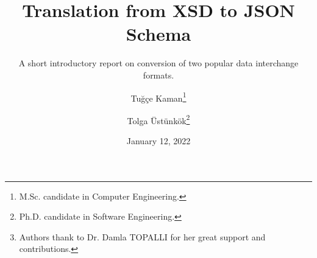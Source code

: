 \documentclass[paper=a4,oneside,fontsize=12,parskip=full,titlepage=firstiscover,toc=sectionentrywithdots]{scrartcl}
\begin{document}
    \titlehead{Atılım University\\Department of Computer Engineering}
    \title{Translation from XSD to JSON Schema}
    \subtitle{A short introductory report on conversion of two popular data interchange formats.}
    \author{Tuğçe Kaman\thanks{M.Sc. candidate in Computer Engineering.} \and Tolga Üstünkök\thanks{Ph.D. candidate in Software Engineering.}}
    \date{January 12, 2022}
    \publishers{CMPE541 - Advanced Databases\thanks{Authors thank to Dr. Damla TOPALLI for her great support and contributions.}}
    \maketitle
    \tableofcontents\newpage

    
    
    
    

    \printbibliography[heading=bibintoc]
\end{document}
